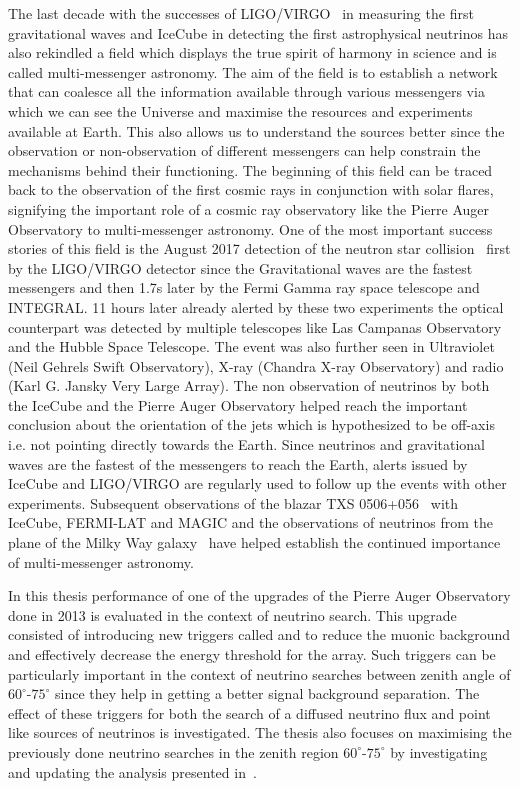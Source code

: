 The last decade with the successes of LIGO/VIRGO~\cite{PhysRevLett.116.061102} in measuring the first gravitational waves and IceCube in detecting the first astrophysical neutrinos has also rekindled a field which displays the true spirit of harmony in science and is called multi-messenger astronomy. The aim of the field is to establish a network that can coalesce all the information available through various messengers via which we can see the Universe and maximise the resources and experiments available at Earth. This also allows us to understand the sources better since the observation or non-observation of different messengers can help constrain the mechanisms behind their functioning. The beginning of this field can be traced back to the observation of the first cosmic rays in conjunction with solar flares, signifying the important role of a cosmic ray observatory like the Pierre Auger Observatory to multi-messenger astronomy. One of the most important success stories of this field is the August 2017 detection of the neutron star collision~\cite{Abbott_2017} first by the LIGO/VIRGO detector since the Gravitational waves are the fastest messengers and then 1.7s later by the Fermi Gamma ray space telescope and INTEGRAL. 11 hours later already alerted by these two experiments the optical counterpart was detected by multiple telescopes like Las Campanas Observatory and the Hubble Space Telescope. The event was also further seen in Ultraviolet (Neil Gehrels Swift Observatory), X-ray (Chandra X-ray Observatory) and radio (Karl G. Jansky Very Large Array). The non observation of neutrinos by both the IceCube and the Pierre Auger Observatory helped reach the important conclusion about the orientation of the jets which is hypothesized to be off-axis i.e. not pointing directly towards the Earth. Since neutrinos and gravitational waves are the fastest of the messengers to reach the Earth, alerts issued by IceCube and LIGO/VIRGO are regularly used to follow up the events with other experiments. Subsequent observations of the blazar TXS 0506+056~\cite{TXS_Multi_2018} with IceCube, FERMI-LAT and MAGIC and the observations of neutrinos from the plane of the Milky Way galaxy~\cite{Galactic_plane_nu_2023} have helped establish the continued importance of multi-messenger astronomy.

In this thesis performance of one of the upgrades of the Pierre Auger Observatory done in 2013 is evaluated in the context of neutrino search. This upgrade consisted of introducing new triggers called  and  to reduce the muonic background and effectively decrease the energy threshold for the array. Such triggers can be particularly important in the context of neutrino searches between zenith angle of $60^\circ$-$75^\circ$ since they help in getting a better signal background separation. The effect of these triggers for both the search of a diffused neutrino flux and point like sources of neutrinos is investigated. The thesis also focuses on maximising the previously done neutrino searches in the zenith region $60^\circ$-$75^\circ$ by investigating and updating the analysis presented in~\cite{Aab_2019_diffuse, gap_note_2013}.

